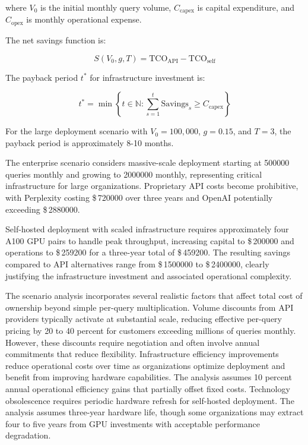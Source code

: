 where $V_0$ is the initial monthly query volume, $C_{\text{capex}}$ is capital expenditure, and $C_{\text{opex}}$ is monthly operational expense.

The net savings function is:

\begin{equation}
S(V_0, g, T) = \text{TCO}_{\text{API}} - \text{TCO}_{\text{self}}
\label{eq:net_savings}
\end{equation}

The payback period $t^*$ for infrastructure investment is:

\begin{equation}
t^* = \min\left\{t \in \mathbb{N} : \sum_{s=1}^{t} \text{Savings}_s \geq C_{\text{capex}}\right\}
\label{eq:payback_period}
\end{equation}

For the large deployment scenario with $V_0 = 100{,}000$, $g = 0.15$, and $T = 3$, the payback period is approximately 8-10 months.

The enterprise scenario considers massive-scale deployment starting at \num{500000} queries monthly and growing to \num{2000000} monthly, representing critical infrastructure for large organizations. Proprietary API costs become prohibitive, with Perplexity costing \$\,\num{720000} over three years and OpenAI potentially exceeding \$\,\num{2880000}. 

Self-hosted deployment with scaled infrastructure requires approximately four A100 GPU pairs to handle peak throughput, increasing capital to \$\,\num{200000} and operations to \$\,\num{259200} for a three-year total of \$\,\num{459200}. The resulting savings compared to API alternatives range from \$\,\num{1500000} to \$\,\num{2400000}, clearly justifying the infrastructure investment and associated operational complexity.


The scenario analysis incorporates several realistic factors that affect total cost of ownership beyond simple per-query multiplication. Volume discounts from API providers typically activate at substantial scale, reducing effective per-query pricing by 20 to 40 percent for customers exceeding millions of queries monthly. However, these discounts require negotiation and often involve annual commitments that reduce flexibility. Infrastructure efficiency improvements reduce operational costs over time as organizations optimize deployment and benefit from improving hardware capabilities. The analysis assumes 10 percent annual operational efficiency gains that partially offset fixed costs. Technology obsolescence requires periodic hardware refresh for self-hosted deployment. The analysis assumes three-year hardware life, though some organizations may extract four to five years from GPU investments with acceptable performance degradation.

